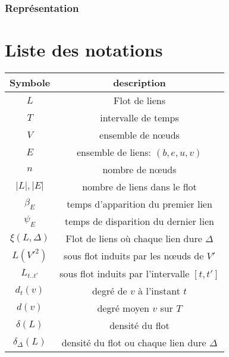 \subsection{Représentation}


\chapter*{Liste des notations}


\begin{center}
\begin{tabular}{|c|c|}
\hline Symbole & description \\
\hline $L$ & Flot de liens \\ 
$T$ & intervalle de temps  \\
$V$ & ensemble de n\oe uds\\
$E$ & ensemble de liens: $(b,e,u,v)$ \\
$n$ & nombre de n\oe uds  \\
$|L|,|E|$ & nombre de liens dans le flot \\
$\beta_E$ & temps d'apparition du premier lien\\
$\psi_E$ & temps de disparition du dernier lien\\
$\xi(L,\Delta)$ & Flot de liens où chaque lien dure $\Delta$\\
$L(V'^2)$ & sous flot induits par les n\oe uds de $V'$ \\
$L_{t..t'}$ & sous flot induits par l'intervalle $[t,t']$ \\
$d_t(v)$ & degré de $v$ à l'instant $t$\\
$d(v)$ & degré moyen $v$ sur $T$\\
$\delta(L)$ & densité du flot\\
$\delta_{\Delta}(L)$ & densité du flot ou chaque lien dure $\Delta$\\

\hline
\end{tabular} 
\end{center}

